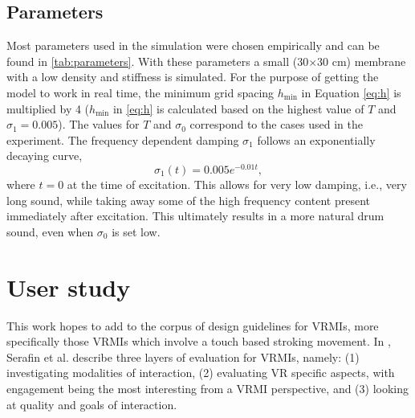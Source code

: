     \subsection{Parameters}
    Most parameters used in the simulation were chosen empirically and can be found in \autoref{tab:parameters}. With these parameters a small (30$\times$30 cm) membrane with a low density and stiffness is simulated. For the purpose of getting the model to work in real time, the minimum grid spacing $h_\text{min}$ in Equation \eqref{eq:h} is multiplied by 4 ($h_\text{min}$ in \eqref{eq:h} is calculated based on the highest value of $T$ and $\sigma_1 = 0.005$). The values for $T$ and $\sigma_0$ correspond to the cases used in the experiment. The frequency dependent damping  $\sigma_1$ follows an exponentially decaying curve, 
    \begin{equation}
        \sigma_1(t) = 0.005e^{-0.01 t},
    \end{equation}
    where $t=0$ at the time of excitation. This allows for very low damping, i.e., very long sound, while taking away some of the high frequency content present immediately after excitation. This ultimately results in a more natural drum sound, even when $\sigma_0$ is set low.
    
    \section{User study}\label{sec:exp}
    
    This work hopes to add to the corpus of design guidelines for VRMIs, more specifically those VRMIs which involve a touch based stroking movement. In \cite{Serafin:2016}, Serafin et al. describe three layers of evaluation for VRMIs, namely: (1) investigating modalities of interaction, (2) evaluating VR specific aspects, with engagement being the most interesting from a VRMI perspective, and (3) looking at quality and goals of interaction.
    
